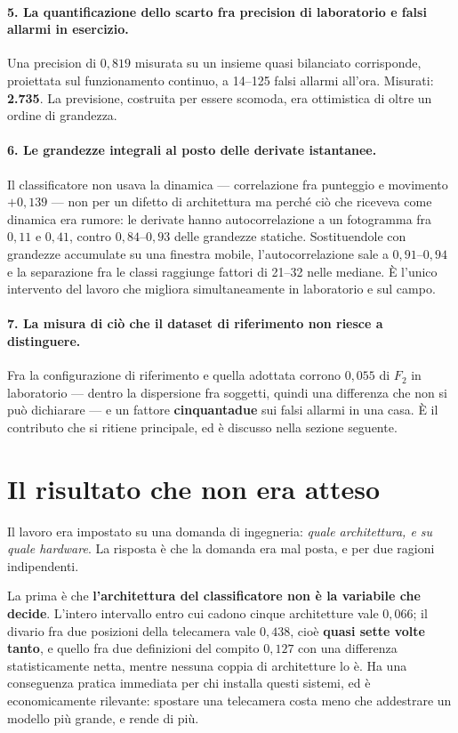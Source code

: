 \paragraph{5. La quantificazione dello scarto fra precision di laboratorio e falsi allarmi in esercizio.} Una precision di $0{,}819$ misurata su un insieme quasi bilanciato corrisponde, proiettata sul funzionamento continuo, a 14--125 falsi allarmi all'ora. Misurati: \textbf{2.735}. La previsione, costruita per essere scomoda, era ottimistica di oltre un ordine di grandezza.

\paragraph{6. Le grandezze integrali al posto delle derivate istantanee.} Il classificatore non usava la dinamica --- correlazione fra punteggio e movimento $+0{,}139$ --- non per un difetto di architettura ma perché ciò che riceveva come dinamica era rumore: le derivate hanno autocorrelazione a un fotogramma fra $0{,}11$ e $0{,}41$, contro $0{,}84$--$0{,}93$ delle grandezze statiche. Sostituendole con grandezze accumulate su una finestra mobile, l'autocorrelazione sale a $0{,}91$--$0{,}94$ e la separazione fra le classi raggiunge fattori di 21--32 nelle mediane. È l'unico intervento del lavoro che migliora simultaneamente in laboratorio e sul campo.

\paragraph{7. La misura di ciò che il dataset di riferimento non riesce a distinguere.} Fra la configurazione di riferimento e quella adottata corrono $0{,}055$ di $F_2$ in laboratorio --- dentro la dispersione fra soggetti, quindi una differenza che non si può dichiarare --- e un fattore \textbf{cinquantadue} sui falsi allarmi in una casa. È il contributo che si ritiene principale, ed è discusso nella sezione seguente.

\section{Il risultato che non era atteso}
\label{sec:risultato-inatteso}

Il lavoro era impostato su una domanda di ingegneria: \emph{quale architettura, e su quale hardware}. La risposta è che la domanda era mal posta, e per due ragioni indipendenti.

La prima è che \textbf{l'architettura del classificatore non è la variabile che decide}. L'intero intervallo entro cui cadono cinque architetture vale $0{,}066$; il divario fra due posizioni della telecamera vale $0{,}438$, cioè \textbf{quasi sette volte tanto}, e quello fra due definizioni del compito $0{,}127$ con una differenza statisticamente netta, mentre nessuna coppia di architetture lo è. Ha una conseguenza pratica immediata per chi installa questi sistemi, ed è economicamente rilevante: spostare una telecamera costa meno che addestrare un modello più grande, e rende di più.

